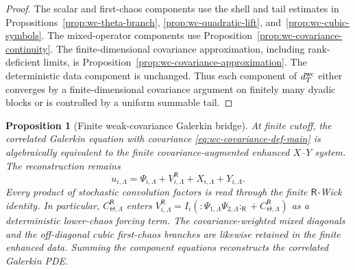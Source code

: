 \documentclass[10pt]{amsart}
\numberwithin{equation}{section}
\theoremstyle{plain}
\newtheorem{proposition}[theorem]{Proposition}
\theoremstyle{definition}
\theoremstyle{remark}
\begin{document}
\begin{proof}
The scalar and first-chaos components use the shell and tail estimates in Propositions~\ref{prop:wc-theta-branch}, \ref{prop:wc-quadratic-lift}, and~\ref{prop:wc-cubic-symbols}.  The mixed-operator components use Proposition~\ref{prop:wc-covariance-continuity}.  The finite-dimensional covariance approximation, including rank-deficient limits, is Proposition~\ref{prop:wc-covariance-approximation}.  The deterministic data component is unchanged.  Thus each component of \(d_T^{\rm wc}\) either converges by a finite-dimensional covariance argument on finitely many dyadic blocks or is controlled by a uniform summable tail.
\end{proof}

\begin{proposition}[Finite weak-covariance Galerkin bridge]\label{prop:wc-galerkin-bridge}
At finite cutoff, the correlated Galerkin equation with covariance \eqref{eq:wc-covariance-def-main} is algebraically equivalent to the finite covariance-augmented enhanced \(X\)--\(Y\) system.  The reconstruction remains
\begin{equation}
        u_{i,\Lambda}=\Psi_{i,\Lambda}+V_{i,\Lambda}^{\mathsf R}+X_{i,\Lambda}+Y_{i,\Lambda}.
\end{equation}
Every product of stochastic convolution factors is read through the finite \(\mathsf R\)-Wick identity.  In particular, \(C_{\Theta,\Lambda}^{\mathsf R}\) enters
\(V_{i,\Lambda}^{\mathsf R}=I_i(:\Psi_{1,\Lambda}\Psi_{2,\Lambda}:_{\mathsf R}+C_{\Theta,\Lambda}^{\mathsf R})\)
as a deterministic lower-chaos forcing term.  The covariance-weighted mixed diagonals and the off-diagonal cubic first-chaos branches are likewise retained in the finite enhanced data.  Summing the component equations reconstructs the correlated Galerkin PDE.
\end{proposition}
\end{document}
